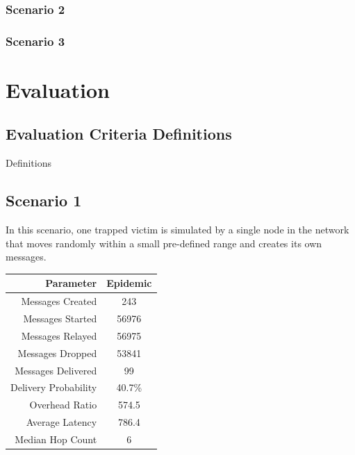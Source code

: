\documentclass{article}
\begin{document}
\subsubsection{Scenario 2}
\subsubsection{Scenario 3}

\newpage
\section{Evaluation}
\subsection{Evaluation Criteria Definitions}
Definitions

\subsection{Scenario 1}
In this scenario, one trapped victim is simulated by a single node in the network that moves randomly within a small pre-defined range and creates its own messages.

\begin{center}
\begin{tabular}{|r|c|}
\hline
\textbf{Parameter} & \textbf{Epidemic} \\ \hline
Messages Created & 243 \\ \hline
Messages Started & 56976 \\ \hline
Messages Relayed & 56975 \\ \hline
Messages Dropped & 53841 \\ \hline
Messages Delivered & 99 \\ \hline
Delivery Probability & 40.7\%\\ \hline
Overhead Ratio & 574.5 \\ \hline
Average Latency & 786.4 \\ \hline
Median Hop Count & 6 \\ \hline
\end{tabular}
\end{center}
\end{document}

